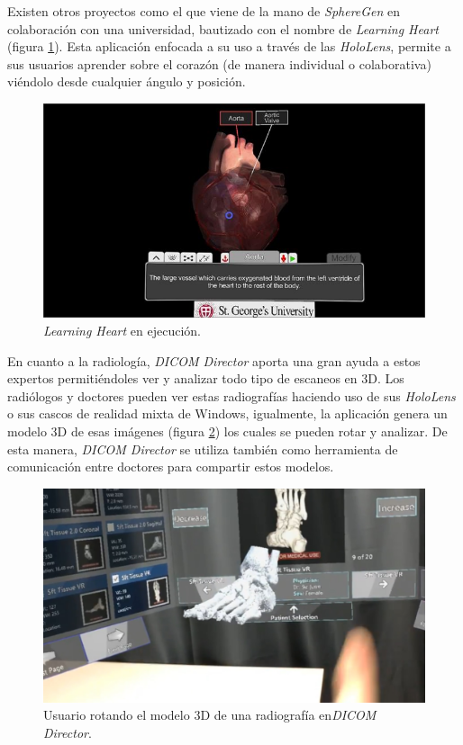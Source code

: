 Existen otros proyectos como el que viene de la mano de \textit{SphereGen} en colaboración con una universidad, bautizado con el nombre de \textit{Learning Heart} (figura \ref{fig:learningheartspheregen}). Esta aplicación enfocada a su uso a través de las \textit{HoloLens}, permite a sus usuarios aprender sobre el corazón (de manera individual o colaborativa) viéndolo desde cualquier ángulo y posición. 

\begin{figure}[h]
    \centering
    \includegraphics[scale=0.65]{Images/Estado del arte/learningheartspheregen.jpeg}
    \caption{\textit{Learning Heart} en ejecución.}
    \label{fig:learningheartspheregen}
\end{figure}




En cuanto a la radiología, \textit{DICOM Director} aporta una gran ayuda a estos expertos permitiéndoles ver y analizar todo tipo de escaneos en 3D. Los radiólogos y doctores pueden ver estas radiografías haciendo uso de sus \textit{HoloLens} o sus cascos de realidad mixta de Windows, igualmente, la aplicación genera un modelo 3D de esas imágenes (figura \ref{fig:dicomDirector}) los cuales se pueden rotar y analizar. De esta manera, \textit{DICOM Director} se utiliza también como herramienta de comunicación entre doctores para compartir estos modelos.

\begin{figure}[h]
    \centering
    \includegraphics[scale=0.25]{Images/Estado del arte/dicomdirector.jpg}
    \caption{Usuario rotando el modelo 3D de una radiografía en\textit{DICOM Director}.}
    \label{fig:dicomDirector}
\end{figure}


